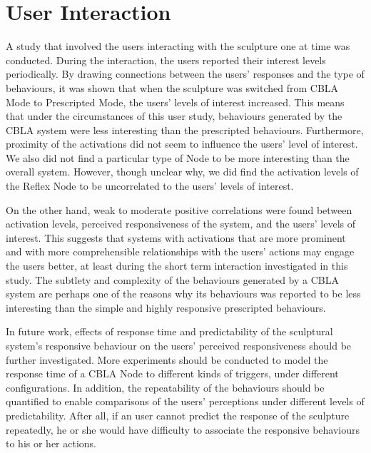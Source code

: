 \section{User Interaction}
A study that involved the users interacting with the sculpture one at time was conducted. During the interaction, the users reported their interest levels periodically. By drawing connections between the users' responses and the type of behaviours, it was shown that when the sculpture was switched from CBLA Mode to Prescripted Mode, the users' levels of interest increased. This means that under the circumstances of this user study, behaviours generated by the CBLA system were less interesting than the prescripted behaviours. 
Furthermore, proximity of the activations did not seem to influence the users' level of interest. We also did not find a particular type of Node to be more interesting than the overall system. However, though unclear why, we did find the activation levels of the Reflex Node to be uncorrelated to the users' levels of interest. 

On the other hand, weak to moderate positive correlations were found between activation levels, perceived responsiveness of the system, and the users' levels of interest. This suggests that systems with activations that are more prominent and with more comprehensible relationships with the users' actions may engage the users better, at least during the short term interaction investigated in this study. The subtlety and complexity of the behaviours generated by a CBLA system are perhaps one of the reasons why its behaviours was reported to be less interesting than the simple and highly responsive prescripted behaviours. 

In future work, effects of response time and predictability of the sculptural system's responsive behaviour on the users' perceived responsiveness should be further investigated. More experiments should be conducted to model the response time of a CBLA Node to different kinds of triggers, under different configurations. In addition, the repeatability of the behaviours should be quantified to enable comparisons of the users' perceptions under different levels of predictability. After all, if an user cannot predict the response of the sculpture repeatedly, he or she would have difficulty to associate the responsive behaviours to his or her actions.

